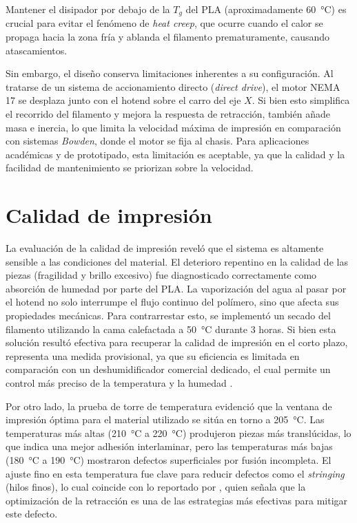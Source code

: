 Mantener el disipador por debajo de la \(T_g\) del PLA (aproximadamente \qty{60}{\celsius}) es crucial para evitar el fenómeno de \textit{heat creep}, que ocurre cuando el calor se propaga hacia la zona fría y ablanda el filamento prematuramente, causando atascamientos.

Sin embargo, el diseño conserva limitaciones inherentes a su configuración. Al tratarse de un sistema de accionamiento directo (\textit{direct drive}), el motor NEMA 17 se desplaza junto con el hotend sobre el carro del eje \(X\). Si bien esto simplifica el recorrido del filamento y mejora la respuesta de retracción, también añade masa e inercia, lo que limita la velocidad máxima de impresión en comparación con sistemas \textit{Bowden}, donde el motor se fija al chasis. Para aplicaciones académicas y de prototipado, esta limitación es aceptable, ya que la calidad y la facilidad de mantenimiento se priorizan sobre la velocidad. 

\section{Calidad de impresión}
\label{sec:discusion_calidad}

La evaluación de la calidad de impresión reveló que el sistema es altamente sensible a las condiciones del material. El deterioro repentino en la calidad de las piezas (fragilidad y brillo excesivo) fue diagnosticado correctamente como absorción de humedad por parte del PLA. La vaporización del agua al pasar por el hotend no solo interrumpe el flujo continuo del polímero, sino que afecta sus propiedades mecánicas. Para contrarrestar esto, se implementó un 
secado del filamento utilizando la cama calefactada a \qty{50}{\celsius} durante 3 horas. Si bien esta solución resultó efectiva para recuperar la calidad de impresión en el corto plazo, representa una medida provisional, ya que su eficiencia es limitada en comparación con un deshumidificador comercial dedicado, el cual permite un control más preciso de la temperatura y la humedad \cite{prusa_overdrying}.

Por otro lado, la prueba de torre de temperatura evidenció que la ventana de impresión óptima para el material utilizado se sitúa en torno a \qty{205}{\celsius}. Las temperaturas más altas (\qty{210}{\celsius} a \qty{220}{\celsius}) produjeron piezas más translúcidas, lo que indica una mejor adhesión interlaminar, pero las temperaturas más bajas (\qty{180}{\celsius} a \qty{190}{\celsius}) mostraron defectos superficiales por fusión incompleta. El ajuste fino en esta temperatura fue clave para reducir defectos como el \textit{stringing} (hilos finos), lo cual coincide con lo reportado por \cite{creality_stringing_guide}, quien señala que la optimización de la retracción es una de las estrategias más efectivas para mitigar este defecto.

